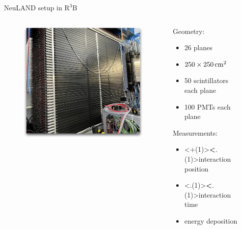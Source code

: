 \documentclass[compress, 13pt, aspectratio=169]{beamer}
\begin{document}
{\begin{frame}{NeuLAND setup in $\text{R}^3\text{B}$}
	\begin{columns}[c]
		\begin{column}{0.4\textwidth}
			\pause
			\begin{figure}
				\includegraphics[width = \textwidth]{neulandReal}
			\end{figure}
		\end{column}
		\hspace*{0.5cm}
		\begin{column}{0.3\textwidth}
			\begin{exampleblock}{}
				Geometry:\\
				\begin{itemize}
					\item 26 planes
					\item $\qtyproduct[product-units=power]{250 x 250}{\centi\meter}$
					\item 50 scintillators each plane
					\item 100 PMTs each plane
				\end{itemize}
				\pause
				Measurements:\\
				\begin{itemize}
					\item \alert<+(1)>{\textbf<.(1)>{interaction position}}
					\item \alert<.(1)>{\textbf<.(1)>{interaction time}}
					\item energy deposition
				\end{itemize}
			\end{exampleblock}
		\end{column}
		\begin{column}{0.3\textwidth}
		\end{column}

	\end{columns}
	\let\thefootnote\relax{}
\end{frame}
}
\end{document}
